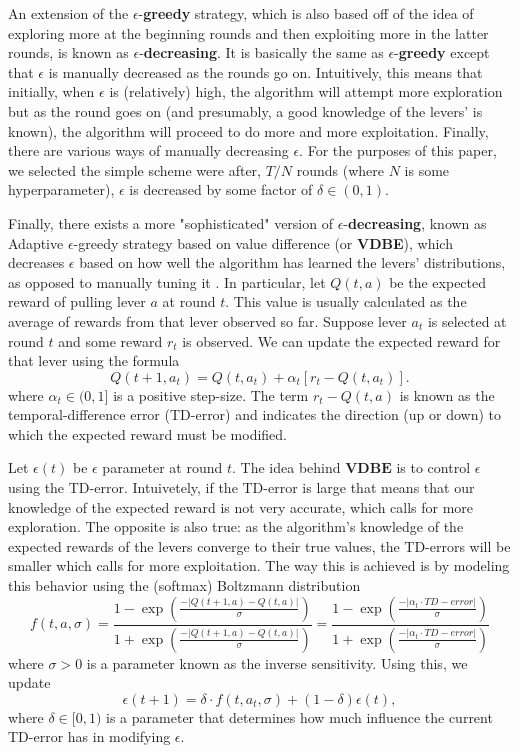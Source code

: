 \documentclass[12pt]{article}
\begin{document}
An extension of the $\epsilon$-\textbf{greedy} strategy, which is also based off of the idea of exploring more at the beginning rounds and then exploiting more in the latter rounds, is known as $\epsilon$-\textbf{decreasing}. It is basically the same as $\epsilon$-\textbf{greedy} except that $\epsilon$ is manually decreased as the rounds go on. Intuitively, this means that initially, when $\epsilon$ is (relatively) high, the algorithm will attempt more exploration but as the round goes on (and presumably, a good knowledge of the levers' is known), the algorithm will proceed to do more and more exploitation. Finally, there are various ways of manually decreasing $\epsilon$. For the purposes of this paper, we selected the simple scheme were after, $T/N$ rounds (where $N$ is some hyperparameter), $\epsilon$ is decreased by some factor of $\delta \in (0,1)$.

Finally, there exists a more "sophisticated" version of $\epsilon$-\textbf{decreasing}, known as Adaptive $\epsilon$-greedy strategy based on value difference (or \textbf{VDBE}), which decreases $\epsilon$ based on how well the algorithm has learned the levers' distributions, as opposed to manually tuning it \cite{Tokic:2010:A9E:1882150.1882177}. In particular, let $Q(t, a)$ be the expected reward of pulling lever $a$ at round $t$. This value is usually calculated as the average of rewards from that lever observed so far. Suppose lever $a_t$ is selected at round $t$ and some reward $r_t$ is observed. We can update the expected reward for that lever using the formula
\begin{equation*}
    Q(t+1, a_t) = Q(t,a_t) + \alpha_t [r_{t} - Q(t, a_t)].
\end{equation*}
where $\alpha_t \in (0, 1]$ is a positive step-size. The term $r_{t} - Q(t, a)$ is known as the temporal-difference error (TD-error) and indicates the direction (up or down) to which the expected reward must be modified.

Let $\epsilon(t)$ be $\epsilon$ parameter at round $t$.  The idea behind $\textbf{VDBE}$ is to control $\epsilon$ using the TD-error. Intuivetely, if the TD-error is large that means that our knowledge of the expected reward is not very accurate, which calls for more exploration. The opposite is also true: as the algorithm's knowledge of the expected rewards of the levers converge to their true values, the TD-errors will be smaller which calls for more exploitation. The way this is achieved is by modeling this behavior using the (softmax) Boltzmann distribution
\begin{equation*}
    f(t, a, \sigma)
    = \frac{1 - \exp(\frac{-|Q(t+1, a) - Q(t,a)|}{\sigma} )}{1 + \exp(\frac{-|Q(t+1, a) - Q(t,a)|}{\sigma} )} 
    = \frac{1 - \exp(\frac{-|\alpha_t \cdot TD-error|}{\sigma} )}{1 + \exp(\frac{-|\alpha_t \cdot TD-error|}{\sigma} )}
\end{equation*}
where $\sigma > 0$ is a parameter known as the inverse sensitivity. Using this, we update
\begin{equation*}
    \epsilon(t+1) = \delta \cdot f(t, a_t, \sigma) + (1-\delta) \epsilon(t),
\end{equation*}
where $\delta \in [0,1)$ is a parameter that determines how much influence the current TD-error has in modifying $\epsilon$. 
\end{document}
